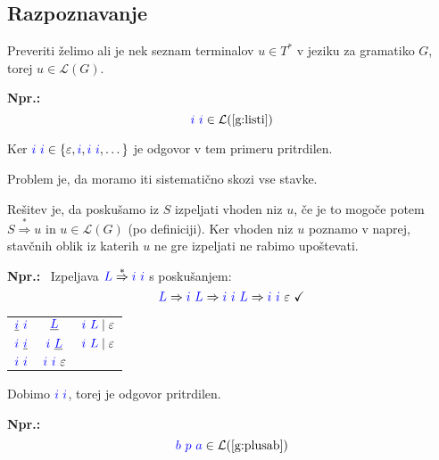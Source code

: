 \documentclass{article}
\newcommand{\Ex}{\textbf{Npr.:}\ }
\newcommand{\OK}{\ \checkmark}
\newcommand{\Symbol}[1]{\textcolor{blue}{#1}}
\newcommand{\Grammar}{G}
\newcommand{\StartSymbol}{S}
\newcommand{\Null}{\varepsilon}
\newcommand{\Language}[1]{\mathcal{L}(#1)}
\newcommand{\MathRef}[1]{\text{\ref{#1}}}
\newcommand{\Derive}{\Rightarrow}
\newcommand{\DeriveStar}{\overset{\ast}{\Rightarrow}}
\newcommand{\Seq}{\ }
\newcommand{\Union}{\mathrel{|}}
\newcommand{\Kleene}[1]{#1^\ast}
\begin{document}
\subsection{Razpoznavanje}

Preveriti želimo ali je nek seznam terminalov $u \in \Kleene{T}$ v jeziku za gramatiko $\Grammar$, torej $u \in \Language{\Grammar}$.

\Ex
  \begin{equation*}
    \Symbol{i} \Seq \Symbol{i} \in \Language{\MathRef{g:listi}}
  \end{equation*}

  Ker $\Symbol{i} \Seq \Symbol{i} \in \{\Null, \Symbol{i}, \Symbol{i} \Seq \Symbol{i}, \dots\}$ je odgovor v tem primeru pritrdilen.

Problem je, da moramo iti sistematično skozi vse stavke.

Rešitev je, da poskušamo iz $\StartSymbol$ izpeljati vhoden niz $u$, če je to mogoče potem $\StartSymbol \DeriveStar u$ in $u \in \Language{\Grammar}$ (po definiciji).
Ker vhoden niz $u$ poznamo v naprej, stavčnih oblik iz katerih $u$ ne gre izpeljati ne rabimo upoštevati.

\Ex
Izpeljava $\Symbol{L} \DeriveStar \Symbol{i} \Seq \Symbol{i}$ s poskušanjem:
  \begin{equation*}
    \Symbol{L} \Derive \Symbol{i} \Seq \Symbol{L} \Derive \Symbol{i} \Seq \Symbol{i} \Seq \Symbol{L} \Derive \Symbol{i} \Seq \Symbol{i} \Seq \Null \OK
  \end{equation*}
  \begin{center}
  \begin{tabular}{|c|c|c|}
    \hline
    $\underline{\Symbol{i}} \Seq \Symbol{i}$ & $\underline{\Symbol{L}}$ & $\Symbol{i} \Seq \Symbol{L} \Union \Null$ \\ 
    $\Symbol{i} \Seq \underline{\Symbol{i}}$ & $\Symbol{i} \Seq \underline{\Symbol{L}}$ & $\Symbol{i} \Seq \Symbol{L} \Union \Null$ \\ 
    \hline
    $\Symbol{i} \Seq \Symbol{i}$ & $\Symbol{i} \Seq \Symbol{i} \Seq \Null$  &  \\ 
    \hline
  \end{tabular}
  \end{center}
  Dobimo $\Symbol{i} \Seq \Symbol{i}$, torej je odgovor pritrdilen.

\Ex
  \begin{equation*}
    \Symbol{b} \Seq \Symbol{p} \Seq \Symbol{a} \in \Language{\MathRef{g:plusab}}
  \end{equation*}
\end{document}
